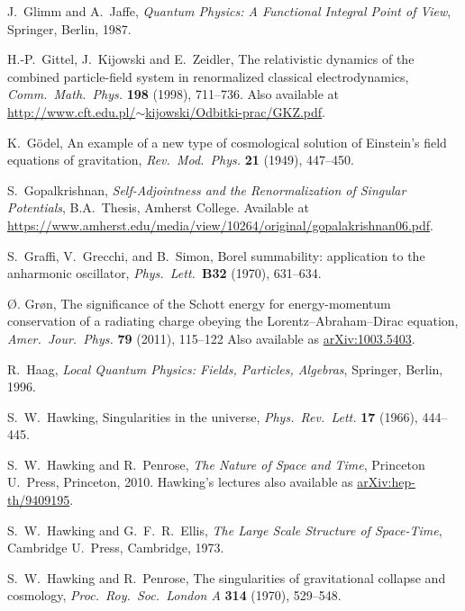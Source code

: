 \documentclass[12pt]{article}
\begin{document}
\begin{thebibliography}{10}
 J.\ Glimm and A.\ Jaffe, \textsl{Quantum Physics: A Functional Integral Point of View}, Springer, Berlin, 1987. 

 H.-P.\ Gittel, J.\ Kijowski and E.\ Zeidler, The relativistic 
dynamics of the combined particle-field system in renormalized classical 
electrodynamics, \textsl{Comm.\ Math.\ Phys.} \textbf{198} (1998), 711--736.
Also available at \href{http://www.cft.edu.pl/~kijowski/Odbitki-prac/GKZ.pdf}{http://www.cft.edu.pl/$\sim$kijowski/Odbitki-prac/GKZ.pdf}.

 K.\ G\"odel, An example of a new type of cosmological solution of Einstein's field equations of gravitation, \textsl{Rev.\ Mod.\ Phys.} \textbf{21} (1949), 447--450. 

 S.\ Gopalkrishnan, \textsl{Self-Adjointness and the Renormalization of Singular Potentials}, B.A.\ Thesis, Amherst College.  Available at \href{https://www.amherst.edu/media/view/10264/original/gopalakrishnan06.pdf}{https://www.amherst.edu/media/view/10264/original/gopalakrishnan06.pdf}.

 S.\ Graffi, V.\ Grecchi, and B.\ Simon, Borel summability: application to the anharmonic oscillator, \textsl{Phys.\ Lett.\ }\textbf{B32} (1970), 631--634.

 \O. Gr\o n, The significance of the Schott energy for energy-momentum conservation of a radiating charge obeying the Lorentz--Abraham--Dirac equation, \textsl{Amer.\ Jour.\ Phys.} \textbf{79} (2011), 115--122  Also available as \href{http://arxiv.org/abs/1003.5403}{arXiv:1003.5403}.

 R.\ Haag, \textsl{Local Quantum Physics: Fields, Particles, Algebras}, Springer, Berlin, 1996.

 S.\ W.\ Hawking, Singularities in the universe, \textsl{Phys.\ Rev.\ Lett.} \textbf{17} (1966), 444--445.

 S.\ W.\ Hawking and R.\ Penrose, \textsl{The Nature
of Space and Time}, Princeton U.\ Press, Princeton, 2010.   Hawking's lectures also available as \href{http://arxiv.org/abs/hep-th/9409195}{arXiv:hep-th/9409195}.

 S.\ W.\ Hawking and G.\ F.\ R.\ Ellis, \textsl{The Large Scale Structure of Space-Time}, Cambridge U.\ Press, Cambridge, 1973.

 S.\ W.\ Hawking and R.\ Penrose, The singularities of gravitational collapse and cosmology, \textsl{Proc.\ Roy.\ Soc.\ London A} \textbf{314} (1970), 529--548.


\end{thebibliography}
\end{document}
